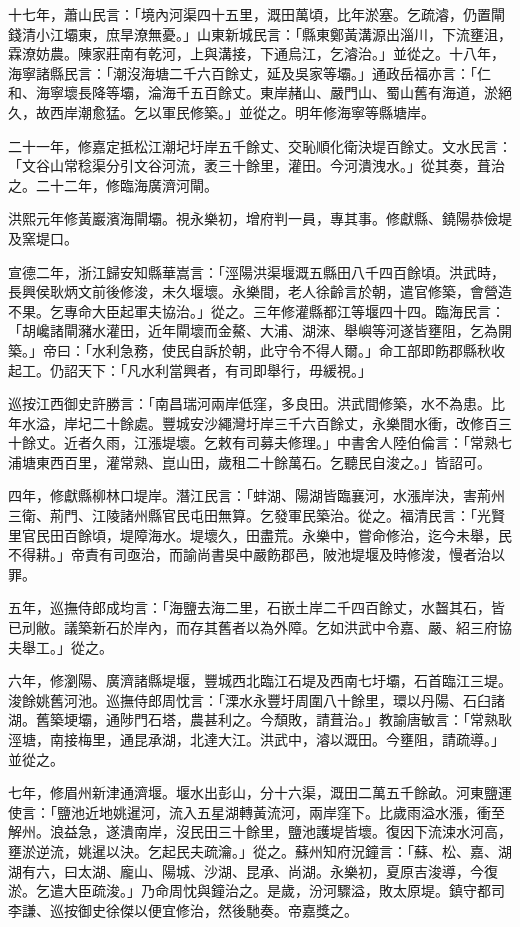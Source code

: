 十七年，蕭山民言：「境內河渠四十五里，溉田萬頃，比年淤塞。乞疏濬，仍置閘錢清小江壩東，庶旱潦無憂。」山東新城民言：「縣東鄭黃溝源出淄川，下流壅沮，霖潦妨農。陳家莊南有乾河，上與溝接，下通烏江，乞濬治。」並從之。十八年，海寧諸縣民言：「潮沒海塘二千六百餘丈，延及吳家等壩。」通政岳福亦言：「仁和、海寧壞長降等壩，淪海千五百餘丈。東岸赭山、嚴門山、蜀山舊有海道，淤絕久，故西岸潮愈猛。乞以軍民修築。」並從之。明年修海寧等縣塘岸。

二十一年，修嘉定抵松江潮圮圩岸五千餘丈、交恥順化衛決堤百餘丈。文水民言：「文谷山常稔渠分引文谷河流，袤三十餘里，灌田。今河潰洩水。」從其奏，葺治之。二十二年，修臨海廣濟河閘。

洪熙元年修黃巖濱海閘壩。視永樂初，增府判一員，專其事。修獻縣、鐃陽恭儉堤及窯堤口。

宣德二年，浙江歸安知縣華嵩言：「涇陽洪渠堰溉五縣田八千四百餘頃。洪武時，長興侯耿炳文前後修浚，未久堰壞。永樂間，老人徐齡言於朝，遣官修築，會營造不果。乞專命大臣起軍夫協治。」從之。三年修灌縣都江等堰四十四。臨海民言：「胡巉諸閘瀦水灌田，近年閘壞而金鰲、大浦、湖淶、舉嶼等河遂皆壅阻，乞為開築。」帝曰：「水利急務，使民自訴於朝，此守令不得人爾。」命工部即飭郡縣秋收起工。仍詔天下：「凡水利當興者，有司即舉行，毋緩視。」

巡按江西御史許勝言：「南昌瑞河兩岸低窪，多良田。洪武間修築，水不為患。比年水溢，岸圮二十餘處。豐城安沙繩灣圩岸三千六百餘丈，永樂間水衝，改修百三十餘丈。近者久雨，江漲堤壞。乞敕有司募夫修理。」中書舍人陸伯倫言：「常熟七浦塘東西百里，灌常熟、崑山田，歲租二十餘萬石。乞聽民自浚之。」皆詔可。

四年，修獻縣柳林口堤岸。潛江民言：「蚌湖、陽湖皆臨襄河，水漲岸決，害荊州三衛、荊門、江陵諸州縣官民屯田無算。乞發軍民築治。從之。福清民言：「光賢里官民田百餘頃，堤障海水。堤壞久，田盡荒。永樂中，嘗命修治，迄今未舉，民不得耕。」帝責有司亟治，而諭尚書吳中嚴飭郡邑，陂池堤堰及時修浚，慢者治以罪。

五年，巡撫侍郎成均言：「海鹽去海二里，石嵌土岸二千四百餘丈，水齧其石，皆已刓敝。議築新石於岸內，而存其舊者以為外障。乞如洪武中令嘉、嚴、紹三府協夫舉工。」從之。

六年，修瀏陽、廣濟諸縣堤堰，豐城西北臨江石堤及西南七圩壩，石首臨江三堤。浚餘姚舊河池。巡撫侍郎周忱言：「溧水永豐圩周圍八十餘里，環以丹陽、石臼諸湖。舊築埂壩，通陟門石塔，農甚利之。今頹敗，請葺治。」教諭唐敏言：「常熟耿涇塘，南接梅里，通昆承湖，北達大江。洪武中，濬以溉田。今壅阻，請疏導。」並從之。

七年，修眉州新津通濟堰。堰水出彭山，分十六渠，溉田二萬五千餘畝。河東鹽運使言：「鹽池近地姚暹河，流入五星湖轉黃流河，兩岸窪下。比歲雨溢水漲，衝至解州。浪益急，遂潰南岸，沒民田三十餘里，鹽池護堤皆壞。復因下流涑水河高，壅淤逆流，姚暹以決。乞起民夫疏瀹。」從之。蘇州知府況鐘言：「蘇、松、嘉、湖湖有六，曰太湖、龐山、陽城、沙湖、昆承、尚湖。永樂初，夏原吉浚導，今復淤。乞遣大臣疏浚。」乃命周忱與鐘治之。是歲，汾河驟溢，敗太原堤。鎮守都司李謙、巡按御史徐傑以便宜修治，然後馳奏。帝嘉獎之。

